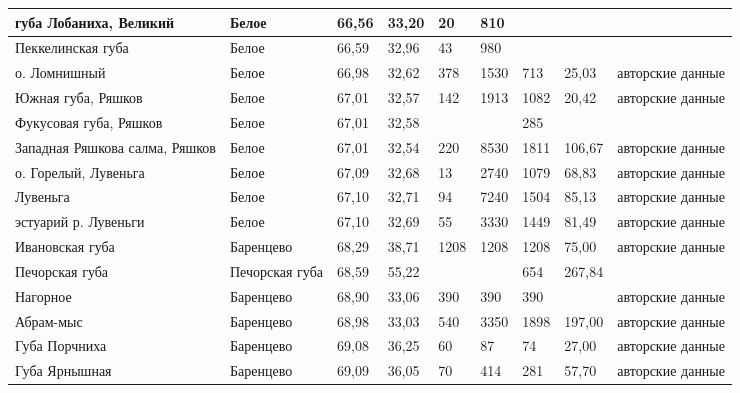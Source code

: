 \begin{footnotesize}
\begin{center}
\begin{longtable}{|p{3cm}p{2cm}|*{2}{p{1cm}}|*{3}{p{0.9cm}}|p{0.9cm}|p{2cm}|}
губа Лобаниха, Великий              & Белое            & 66,56  & 33,20   & 20   & 810  &       &        & \cite{Semenova_1974}	\\ \hline
Пеккелинская губа                   & Белое            & 66,59  & 32,96   & 43   & 980  &       &        & \cite{Semenova_1974}	\\ \hline
о. Ломнишный                        & Белое            & 66,98  & 32,62   & 378  & 1530 & 713   & 25,03  & авторские данные	\\ \hline
Южная губа, Ряшков                  & Белое            & 67,01  & 32,57   & 142  & 1913 & 1082  & 20,42  & авторские данные	\\ \hline
Фукусовая губа, Ряшков              & Белое            & 67,01  & 32,58   &      &      & 285   &        & \cite{Khaitov_et_al_2007}	\\ \hline
Западная Ряшкова салма, Ряшков      & Белое            & 67,01  & 32,54   & 220  & 8530 & 1811  & 106,67 & авторские данные	\\ \hline
о. Горелый, Лувеньга                & Белое            & 67,09  & 32,68   & 13   & 2740 & 1079  & 68,83  & авторские данные	\\ \hline
Лувеньга                            & Белое            & 67,10  & 32,71   & 94   & 7240 & 1504  & 85,13  & авторские данные	\\ \hline
эстуарий р. Лувеньги                & Белое            & 67,10  & 32,69   & 55   & 3330 & 1449  & 81,49  & авторские данные	\\ \hline
Ивановская губа                     & Баренцево        & 68,29  & 38,71   & 1208 & 1208 & 1208  & 75,00  & авторские данные	\\ \hline
Печорская губа                      & Печорская губа   & 68,59  & 55,22   &      &      & 654   & 267,84 & \cite{Denisenko_et_al_2003}	\\ \hline
Нагорное                            & Баренцево        & 68,90  & 33,06   & 390  & 390  & 390   &        & авторские данные	\\ \cline{1-8}
Абрам-мыс                           & Баренцево        & 68,98  & 33,03   & 540  & 3350 & 1898  & 197,00 & авторские данные	\\ \hline
Губа Порчниха                       & Баренцево        & 69,08  & 36,25   & 60   & 87   & 74    & 27,00  & авторские данные	\\ \hline
Губа Ярнышная                       & Баренцево        & 69,09  & 36,05   & 70   & 414  & 281   & 57,70  & авторские данные	\\ \hline

\end{longtable}
\end{center}
\end{footnotesize}

